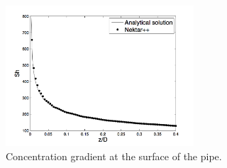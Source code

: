 \begin{figure}[h!]
\begin{center}
\includegraphics[width=7cm]{Figures/graetz-nusselt}
\caption{Concentration gradient at the surface of the pipe.}
\label{f:adrsolver:masstransport}
\end{center}
\end{figure}



